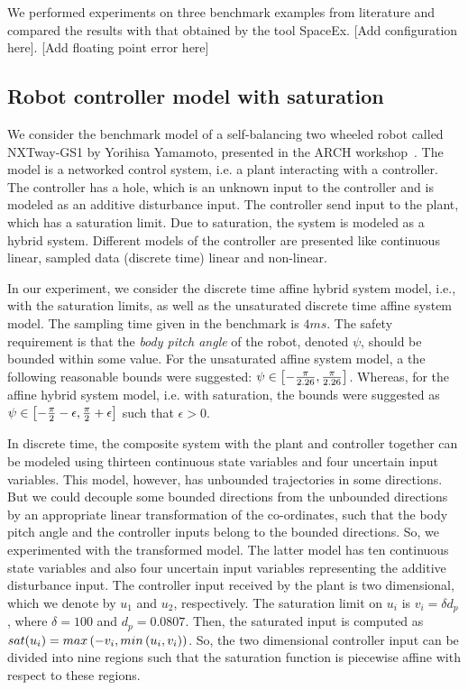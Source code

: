 We performed experiments on three benchmark examples from literature
and compared the results with that obtained by the tool SpaceEx. [Add
  configuration here]. [Add floating point error here]

\subsection{Robot controller model with saturation}   We consider the benchmark
model of a self-balancing two wheeled robot called NXTway-GS1 by
Yorihisa Yamamoto, presented in the ARCH workshop~\cite{TODO}.  The
model is a networked control system, i.e. a plant interacting with a
controller.  The controller has a hole, which is an unknown input to
the controller and is modeled as an additive disturbance input.  The
controller send input to the plant, which has a saturation limit.  Due
to saturation, the system is modeled as a hybrid system.  Different
models of the controller are presented like continuous linear, sampled
data (discrete time) linear and non-linear.

In our experiment, we consider the discrete time affine hybrid system
model, i.e., with the saturation limits, as well as the unsaturated
discrete time affine system model.  The sampling time given in the
benchmark is $4 ms$.  The safety requirement is that the \emph{body
  pitch angle} of the robot, denoted $\psi$, should be bounded within
some value.  For the unsaturated affine system model, a the following
reasonable bounds were suggested:
$\psi\in\left[-\frac{\pi}{2.26},\frac{\pi}{2.26}\right]$.  Whereas, for the
affine hybrid system model, i.e. with saturation, the bounds were
suggested as
$\psi\in\left[-\frac{\pi}{2}-\epsilon,\frac{\pi}{2}+\epsilon\right]$ such
that $\epsilon>0$.

In discrete time, the composite system with the plant and controller
together can be modeled using thirteen continuous state variables and
four uncertain input variables.  This model, however, has unbounded
trajectories in some directions.  But we could decouple some bounded
directions from the unbounded directions by an appropriate linear
transformation of the co-ordinates, such that the body pitch angle and
the controller inputs belong to the bounded directions.  So, we
experimented with the transformed model.  The latter model has ten
continuous state variables and also four uncertain input variables
representing the additive disturbance input.  The controller input
received by the plant is two dimensional, which we denote by $u_1$ and
$u_2$, respectively.  The saturation limit on $u_i$ is $v_i=\delta
d_p$, where $\delta=100$ and $d_p=0.0807$.  Then, the saturated input
is computed as $sat(u_i) = max\left(-v_i,min\left(u_i,v_i\right)\right)$.  So,
the two dimensional controller input can be divided into nine regions
such that the saturation function is piecewise affine with respect to
these regions.  


